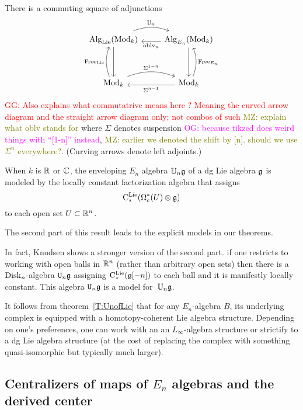 \documentclass[11pt]{amsart}
\numberwithin{equation}{section}
\def\owen{\textcolor{magenta}{OG: }\textcolor{magenta}}
\def\mahmoud{\textcolor{olive}{MZ: }\textcolor{olive}}
\def\greg{\textcolor{red}{GG: }\textcolor{red}}
\begin{document}
\begin{thm}\label{T:UnofLie}
There is a commuting square of adjunctions
\[
\begin{tikzcd}
\Alg_\Lie(\Mod_k) \arrow[r, bend left=20, shift left=.5ex,"\UU_n"] \arrow[dd] & \Alg_{E_n}(\Mod_k) \arrow[l, shift left=.5ex, "\oblv_n"] \arrow[dd]\\
&\\
\Mod_k \arrow[r, bend left=20, shift left=.5ex, "\Sigma^{1-n}"] \arrow[uu, bend left=20, shift left=.5ex, "\Free_\Lie"] & \Mod_k \arrow[l, shift left=.5ex,"\Sigma^{n-1}"] \arrow[uu, bend right=20, shift right=.5ex, "\Free_{E_n}"']
\end{tikzcd}
\]
\greg{Also explains what commutatrive means here ? Meaning the curved arrow diagram and the straight arrow diagram only; not combos of such}
\mahmoud{explain what oblv stands for}
where $\Sigma$ denotes suspension \owen{because tikzcd does weird things with ``[1-n]'' instead}, \mahmoud{earlier we denoted the shift by [n]. should we use $\Sigma^n$ everywhere?}.
(Curving arrows denote left adjoints.)

When $k$ is $\mathbb R$ or $\mathbb C$, 
the enveloping $E_n$ algebra $\mathbb U_n \mathfrak g$ of a dg Lie algebra $\mathfrak g$ is modeled by the locally constant factorization algebra that assigns
\[
{\rm C}^{\rm Lie}_*(\Omega^*_c(U) \otimes \mathfrak g)
\]
to each open set $U \subset \mathbb R^n$.
\end{thm}

The second part of this result leads to the explicit models in our theorems.

In fact, Knudsen shows a stronger version of the second part.
if one restricts to working with open balls in $\mathbb R^n$ (rather than arbitrary open sets)
then there is a ${\rm Disk}_n$-algebra ${\tt U}_n \mathfrak g$ assigning ${\rm C}^{\rm Lie}_*(\mathfrak g[-n])$ to each ball and it is manifestly locally constant.
This algebra ${\tt U}_n \mathfrak g$ is a model for~$\mathbb U_n \mathfrak g$.

\begin{rmk}
It follows from theorem~\ref{T:UnofLie} that for any $E_n$-algebra $B$, 
its underlying complex is equipped with a homotopy-coherent Lie algebra structure.
Depending on one's preferences, one can work with an an $L_\infty$-algebra structure or strictify to a dg Lie algebra structure (at the cost of replacing the complex with something quasi-isomorphic but typically much larger).
\end{rmk}

\subsection{Centralizers of maps of $E_n$ algebras and the derived center}
\label{sec: centralizer}
\end{document}
